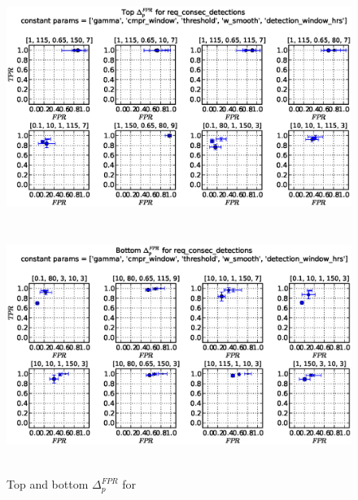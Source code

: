 \begin{figure}[!h]
\begin{center}
\includegraphics[height=3in]{../fig/final/top_fpr/req_consec_detections}
\includegraphics[height=3in]{../fig/final/bottom_fpr/req_consec_detections}
\end{center}
\caption{\label{fig:delta_top_bottom6f} Top and bottom $\Delta_p^{FPR}$ for }
\end{figure}

